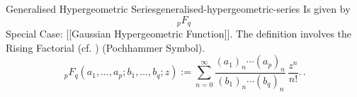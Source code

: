 \begin{definition}{Generalised Hypergeometric Series}{generalised-hypergeometric-series}
  Is given by $$_pF_q$$ Special Case: {[}{[}Gaussian Hypergeometric
  Function{]}{]}. The definition involves the Rising Factorial (cf. )
  (Pochhammer Symbol).
  $${ \,{}_{p}F_{q}(a_{1},\ldots ,a_{p};b_{1},\ldots ,b_{q};z) := \sum _{n=0}^{\infty }{\frac {(a_{1})_{n}\cdots (a_{p})_{n}}{(b_{1})_{n}\cdots (b_{q})_{n}}}\,{\frac {z^{n}}{n!}}.}\,.$$
\end{definition}
